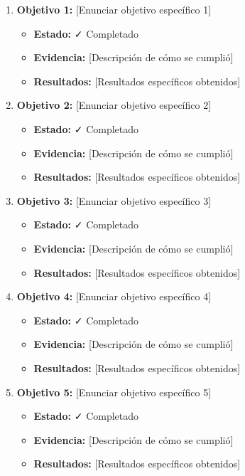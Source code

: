 \begin{enumerate}
    \item \textbf{Objetivo 1:} [Enunciar objetivo específico 1]
        \begin{itemize}
            \item \textbf{Estado:} ✓ Completado
            \item \textbf{Evidencia:} [Descripción de cómo se cumplió]
            \item \textbf{Resultados:} [Resultados específicos obtenidos]
        \end{itemize}
    
    \item \textbf{Objetivo 2:} [Enunciar objetivo específico 2]
        \begin{itemize}
            \item \textbf{Estado:} ✓ Completado
            \item \textbf{Evidencia:} [Descripción de cómo se cumplió]
            \item \textbf{Resultados:} [Resultados específicos obtenidos]
        \end{itemize}
    
    \item \textbf{Objetivo 3:} [Enunciar objetivo específico 3]
        \begin{itemize}
            \item \textbf{Estado:} ✓ Completado
            \item \textbf{Evidencia:} [Descripción de cómo se cumplió]
            \item \textbf{Resultados:} [Resultados específicos obtenidos]
        \end{itemize}
    
    \item \textbf{Objetivo 4:} [Enunciar objetivo específico 4]
        \begin{itemize}
            \item \textbf{Estado:} ✓ Completado
            \item \textbf{Evidencia:} [Descripción de cómo se cumplió]
            \item \textbf{Resultados:} [Resultados específicos obtenidos]
        \end{itemize}
    
    \item \textbf{Objetivo 5:} [Enunciar objetivo específico 5]
        \begin{itemize}
            \item \textbf{Estado:} ✓ Completado
            \item \textbf{Evidencia:} [Descripción de cómo se cumplió]
            \item \textbf{Resultados:} [Resultados específicos obtenidos]
        \end{itemize}
\end{enumerate}

